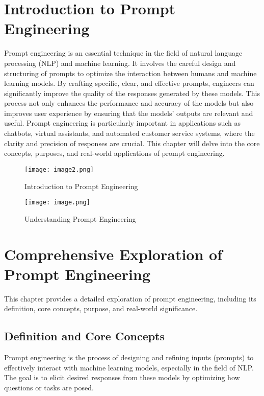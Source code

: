 

\chapter{Introduction to Prompt Engineering}
Prompt engineering is an essential technique in the field of natural language processing (NLP) and machine learning. It involves the careful design and structuring of prompts to optimize the interaction between humans and machine learning models. By crafting specific, clear, and effective prompts, engineers can significantly improve the quality of the responses generated by these models. This process not only enhances the performance and accuracy of the models but also improves user experience by ensuring that the models' outputs are relevant and useful. Prompt engineering is particularly important in applications such as chatbots, virtual assistants, and automated customer service systems, where the clarity and precision of responses are crucial. This chapter will delve into the core concepts, purposes, and real-world applications of prompt engineering.

\begin{figure}
    \centering
    \texttt{[image: image2.png]}
    \caption{Introduction to Prompt Engineering}
    \label{fig:intro-to-prompt-engineering}
\end{figure}

\begin{figure}
    \centering
    \texttt{[image: image.png]}
    \caption{Understanding Prompt Engineering}
    \label{fig:understanding-prompt-engineering}
\end{figure}

\chapter{Comprehensive Exploration of Prompt Engineering}
This chapter provides a detailed exploration of prompt engineering, including its definition, core concepts, purpose, and real-world significance.

\section{Definition and Core Concepts}
Prompt engineering is the process of designing and refining inputs (prompts) to effectively interact with machine learning models, especially in the field of NLP. The goal is to elicit desired responses from these models by optimizing how questions or tasks are posed.

